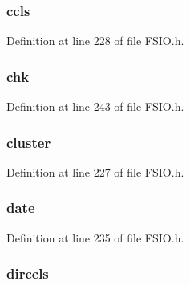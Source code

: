 \subsubsection[{ccls}]{ ccls}\label{struct_f_s_f_i_l_e_affc734a3f8348907cd2bdc7d4413ba95}


Definition at line 228 of file F\+S\+I\+O.\+h.

\hypertarget{struct_f_s_f_i_l_e_abc90ca7abd5ef8886a646f646281c15e}{}
\subsubsection[{chk}]{ chk}\label{struct_f_s_f_i_l_e_abc90ca7abd5ef8886a646f646281c15e}


Definition at line 243 of file F\+S\+I\+O.\+h.

\hypertarget{struct_f_s_f_i_l_e_ae0f63c9bc170b1d40347d0c454719566}{}
\subsubsection[{cluster}]{ cluster}\label{struct_f_s_f_i_l_e_ae0f63c9bc170b1d40347d0c454719566}


Definition at line 227 of file F\+S\+I\+O.\+h.

\hypertarget{struct_f_s_f_i_l_e_a93a1122579f34697f808659478bffef6}{}
\subsubsection[{date}]{ date}\label{struct_f_s_f_i_l_e_a93a1122579f34697f808659478bffef6}


Definition at line 235 of file F\+S\+I\+O.\+h.

\hypertarget{struct_f_s_f_i_l_e_a81489721793fc9db5dbe026c661ce4fd}{}
\subsubsection[{dirccls}]{ dirccls}\label{struct_f_s_f_i_l_e_a81489721793fc9db5dbe026c661ce4fd}


